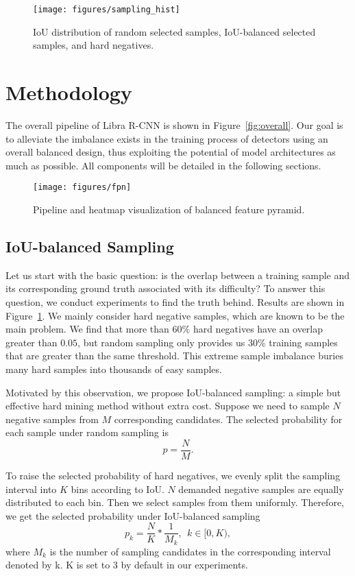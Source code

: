 \documentclass[10pt,twocolumn,letterpaper]{article}
\begin{document}
\begin{figure}
	\centering
	\texttt{[image: figures/sampling\_hist]}
	\caption{IoU distribution of random selected samples, IoU-balanced selected samples, and hard negatives.}
	\label{fig:sample_dist}
\end{figure}
 \section{Methodology}

The overall pipeline of Libra R-CNN is shown in Figure~\ref{fig:overall}.
Our goal is to alleviate the imbalance exists in the training process of detectors using an overall balanced design,
thus exploiting the potential of model architectures as much as possible.
All components will be detailed in the following sections.

\begin{figure*}
	\centering
	\texttt{[image: figures/fpn]}
	\caption{Pipeline and heatmap visualization of balanced feature pyramid.}
	\label{fig:fpn}
\end{figure*}

\subsection{IoU-balanced Sampling}
\label{subsec:sample}
Let us start with the basic question:
is the overlap between a training sample and its corresponding ground truth associated with its difficulty?
To answer this question, we conduct experiments to find the truth behind.
Results are shown in Figure~\ref{fig:sample_dist}.
We mainly consider hard negative samples, which are known to be the main problem.
We find that more than $60\%$ hard negatives have an overlap greater than $0.05$,
but random sampling only provides us $30\%$ training samples that are greater than the same threshold.
This extreme sample imbalance buries many hard samples into thousands of easy samples.

Motivated by this observation, we propose IoU-balanced sampling: a simple but effective hard mining method without extra cost.
Suppose we need to sample $N$ negative samples from $M$ corresponding candidates.
The selected probability for each sample under random sampling is
\begin{equation}
	\label{equ:random}
	p = \frac{N}{M}.
\end{equation}

To raise the selected probability of hard negatives,
we evenly split the sampling interval into $K$ bins according to IoU.
$N$ demanded negative samples are equally distributed to each bin.
Then we select samples from them uniformly.
Therefore, we get the selected probability under IoU-balanced sampling
\begin{equation}
	\label{equ:sample}
	p_{k} = \frac{N}{K} *\frac{1}{M_{k}}, ~~ k \in [0, K),
\end{equation}
where $M_{k}$ is the number of sampling candidates in the corresponding interval denoted by k.
K is set to 3 by default in our experiments.
\end{document}
